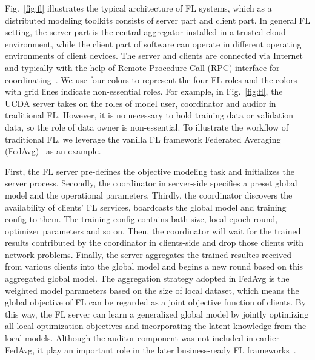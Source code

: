 Fig.~\ref{fig:fl} illustrates the typical architecture of FL systems, which as a distributed modeling toolkits consists of server part and client part. In general FL setting, the server part is the central aggregator installed in a trusted cloud environment, while the client part of software can operate in different operating environments of client devices. 
The server and clients are connected via Internet and typically with the help of Remote Procedure Call (RPC) interface for coordinating~\cite{zhang2022felicitas, abadi2016tensorflow, liu2021fate, beutel2020flower, he2020fedml}.
We use four colors to represent the four FL roles and the colors with grid lines indicate non-essential roles.
For example, in Fig.~\ref{fig:fl}, the UCDA server takes on the roles of model user, coordinator and audior in traditional FL. 
However, it is no necessary to hold training data or validation data, so the role of data owner is non-essential.
To illustrate the workflow of traditional FL, we leverage the vanilla FL framework Federated Averaging (FedAvg)~\cite{mcmahan2017communication, bonawitz2019towards} as an example.

First, the FL server pre-defines the objective modeling task and initializes the server process.
Secondly,  the coordinator in server-side specifies a preset global model and the operational parameters.
Thirdly, the coordinator discovers the availability of clients' FL services, boardcasts the global model and training config to them. The training config contains bath size, local epoch round, optimizer parameters and so on. Then, the coordinator will wait for the trained results contributed by the coordinator in clients-side and drop those clients with network problems.
Finally, the server aggregates the trained resultes received from various clients into the global model and begins a new round based on this aggregated global model. 
The aggregation strategy adopted in FedAvg is the weighted model parameters based on the size of local dataset, which means the global objective of FL can be regarded as a joint objective function of clients. 
By this way, the FL server can learn a generalized global model by jointly optimizing all local optimization objectives and incorporating the latent knowledge from the local models.
Although the auditor component was not included in earlier FedAvg, it play an important role in the later business-ready FL frameworks~\cite{liu2021fate,roth2022nvidia, ziller2021pysyft}.

